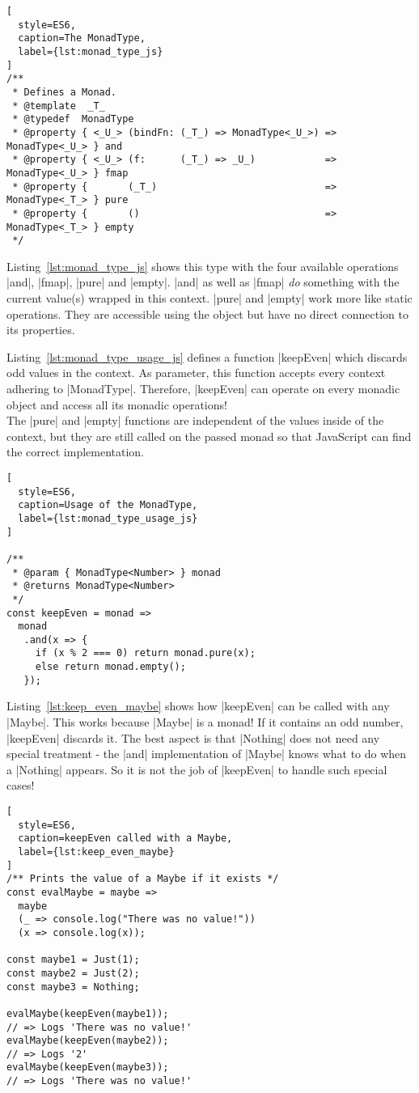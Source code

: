 \begin{lstlisting}[
  style=ES6,
  caption=The MonadType,
  label={lst:monad_type_js}
]
/**
 * Defines a Monad.
 * @template  _T_
 * @typedef  MonadType
 * @property { <_U_> (bindFn: (_T_) => MonadType<_U_>) => MonadType<_U_> } and
 * @property { <_U_> (f:      (_T_) => _U_)            => MonadType<_U_> } fmap
 * @property {       (_T_)                             => MonadType<_T_> } pure
 * @property {       ()                                => MonadType<_T_> } empty
 */
\end{lstlisting}

Listing~\ref{lst:monad_type_js} shows this type with the four available
operations |and|, |fmap|, |pure| and |empty|. |and| as well as |fmap| \textit{do}
something with the current value(s) wrapped in this context. |pure| and |empty|
work more like static operations. They are accessible using the object but have
no direct connection to its properties. 

Listing~\ref{lst:monad_type_usage_js} defines a function |keepEven| which
discards odd values in the context. As parameter, this function accepts every context
adhering to |MonadType|. Therefore, |keepEven| can operate on every monadic
object and access all its monadic operations!\\
The |pure| and |empty| functions are independent of the values inside of the
context, but they are still called on the passed monad so that JavaScript can
find the correct implementation.

\begin{lstlisting}[
  style=ES6,
  caption=Usage of the MonadType,
  label={lst:monad_type_usage_js}
]

/**
 * @param { MonadType<Number> } monad
 * @returns MonadType<Number>
 */
const keepEven = monad => 
  monad
   .and(x => {
     if (x % 2 === 0) return monad.pure(x);
     else return monad.empty();
   }); 
\end{lstlisting}

Listing~\ref{lst:keep_even_maybe} shows how |keepEven| can be called with any
|Maybe|. This works because |Maybe| is a monad! If it contains an odd number,
|keepEven| discards it. The best aspect is that |Nothing| does not need any
special treatment - the |and| implementation of |Maybe| knows what to do when a
|Nothing| appears. So it is not the job of |keepEven| to handle such special
cases!

\begin{lstlisting}[
  style=ES6,
  caption=keepEven called with a Maybe,
  label={lst:keep_even_maybe}
]
/** Prints the value of a Maybe if it exists */
const evalMaybe = maybe =>
  maybe
  (_ => console.log("There was no value!"))
  (x => console.log(x));

const maybe1 = Just(1);
const maybe2 = Just(2);
const maybe3 = Nothing;

evalMaybe(keepEven(maybe1));
// => Logs 'There was no value!'
evalMaybe(keepEven(maybe2));
// => Logs '2'
evalMaybe(keepEven(maybe3));
// => Logs 'There was no value!'
\end{lstlisting}

